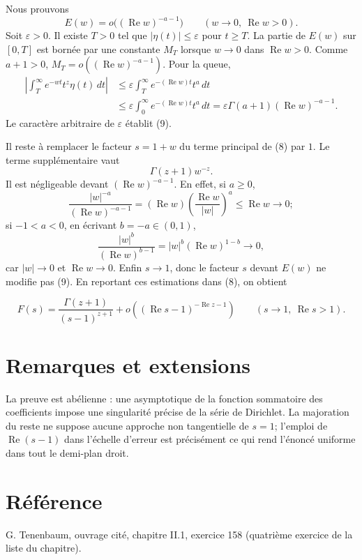 \documentclass[11pt,a4paper]{article}
\newcommand{\eps}{\varepsilon}
\DeclareMathOperator{\re}{Re}
\begin{document}
Nous prouvons
\[
 E(w)=o\bigl((\re w)^{-a-1}\bigr)\qquad(w\to0,\ \re w>0). \tag{9}
\]
Soit $\eps>0$. Il existe $T>0$ tel que $|\eta(t)|\leq\eps$ pour $t\geq T$.
La partie de $E(w)$ sur $[0,T]$ est born\'ee par une constante $M_T$ lorsque
$w\to0$ dans $\re w>0$. Comme $a+1>0$,
$M_T=o((\re w)^{-a-1})$. Pour la queue,
\begin{align*}
\left|\int_T^\infty e^{-wt}t^z\eta(t)\,dt\right|
&\leq\eps\int_T^\infty e^{-(\re w)t}t^a\,dt\\
&\leq\eps\int_0^\infty e^{-(\re w)t}t^a\,dt
=\eps\Gamma(a+1)(\re w)^{-a-1}.
\end{align*}
Le caract\`ere arbitraire de $\eps$ \'etablit (9).

Il reste \`a remplacer le facteur $s=1+w$ du terme principal de (8) par $1$.
Le terme suppl\'ementaire vaut
\[
 \Gamma(z+1)w^{-z}.
\]
Il est n\'egligeable devant $(\re w)^{-a-1}$. En effet, si $a\geq0$,
\[
 \frac{|w|^{-a}}{(\re w)^{-a-1}}
 =(\re w)\left(\frac{\re w}{|w|}\right)^a\leq\re w\to0;
\]
si $-1<a<0$, en \'ecrivant $b=-a\in(0,1)$,
\[
 \frac{|w|^b}{(\re w)^{b-1}}
 =|w|^b(\re w)^{1-b}\longrightarrow0,
\]
car $|w|\to0$ et $\re w\to0$. Enfin $s\to1$, donc le facteur $s$ devant
$E(w)$ ne modifie pas (9). En reportant ces estimations dans (8), on obtient
\begin{resultbox}
\[
 \boxed{\displaystyle
 F(s)=\frac{\Gamma(z+1)}{(s-1)^{z+1}}
 +o\!\left((\re s-1)^{-\re z-1}\right)}
 \qquad(s\to1,\ \re s>1).
\]
\end{resultbox}

\section{Remarques et extensions}
\begin{remarkbox}
La preuve est ab\'elienne : une asymptotique de la fonction sommatoire des
coefficients impose une singularit\'e pr\'ecise de la s\'erie de Dirichlet. La
majoration du reste ne suppose aucune approche non tangentielle de $s=1$;
l'emploi de $\re(s-1)$ dans l'\'echelle d'erreur est pr\'ecis\'ement ce qui rend
l'\'enonc\'e uniforme dans tout le demi-plan droit.
\end{remarkbox}

\section{R\'ef\'erence}
G. Tenenbaum, ouvrage cit\'e, chapitre II.1, exercice 158 (quatri\`eme exercice
de la liste du chapitre).
\end{document}
